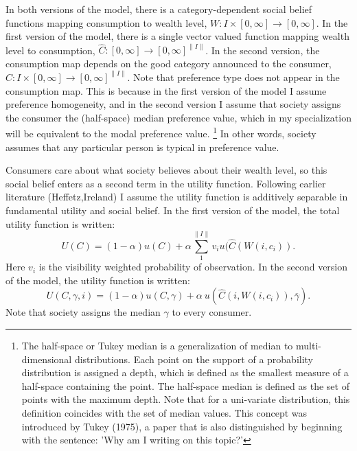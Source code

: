 \documentclass{article}
\begin{document}
In both versions of the model, there is a category-dependent social belief functions mapping consumption to wealth level, $W:I\times[0,\infty]\rightarrow[0,\infty]$.
In the first version of the model, there is a single vector valued function mapping wealth level to consumption, $\hat{C}:[0,\infty]\rightarrow [0,\infty]^{\|I\|}$.
In the second version, the consumption map depends on the good category announced to the consumer, $\hat{C}:I\times[0,\infty]\rightarrow [0,\infty]^{\|I\|}$.
Note that preference type does not appear in the consumption map.
This is because in the first version of the model I assume preference homogeneity, and in the second version I assume that society assigns the consumer the (half-space) median preference value, which in my specialization will be equivalent to the modal preference value.
\footnote{The half-space or Tukey median is a generalization of median to multi-dimensional distributions.  Each point on the support of a probability distribution is assigned a depth, which is defined as the smallest measure of a half-space containing the point. The half-space median is defined as the set of points with the maximum depth.  Note that for a uni-variate distribution, this definition coincides with the set of median values. This concept was introduced by Tukey (1975), a paper that is also distinguished by beginning with the sentence: 'Why am I writing on this topic?'}
In other words, society assumes that any particular person is typical in preference value.

Consumers care about what society believes about their wealth level, so this social belief enters as a second term in the utility function.
Following earlier literature (Heffetz,Ireland) I assume the utility function is additively separable in fundamental utility and social belief.
In the first version of the model, the total utility function is written: \[U(C) = (1-\alpha) u(C) + \alpha \sum_1^{\|I\|} v_i u(\hat{C}(W(i,c_i)).\]
Here $v_i$ is the visibility weighted probability of observation.
In the second version of the model, the utility function is written:
\[U(C,\gamma,i) = (1-\alpha) u(C,\gamma) + \alpha\  u(\hat{C}(i,W(i,c_i)),\overline{\gamma}).\]
Note that society assigns the median $\gamma$ to every consumer.  
\end{document}
